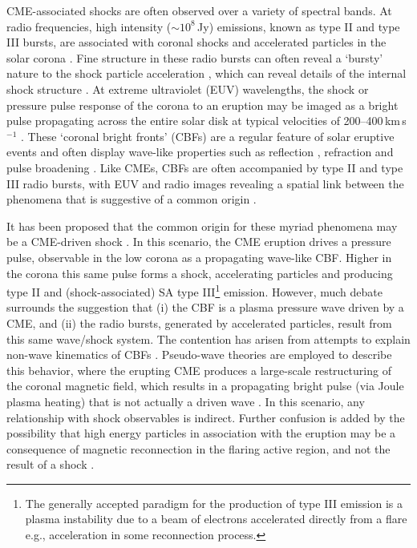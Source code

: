 

CME-associated shocks are often observed over a variety of spectral bands. At radio frequencies, high intensity ($\sim$$10^8$\,Jy) emissions, known as type II and type III bursts, are associated with coronal shocks and accelerated particles in the solar corona \citep{wild1950, mann1996}. Fine structure in these radio bursts can often reveal a \textquoteleft bursty' nature to the shock particle acceleration \citep{mann2005}, which can reveal details of the internal shock structure \citep{zlobec1993, guo2010}.
At extreme ultraviolet (EUV) wavelengths, the shock or pressure pulse response of the corona to an eruption may be imaged as a bright pulse propagating across the entire solar disk at typical velocities of 200--400\,km\,s$^{-1}$ \citep{gallagher2011}. These \textquoteleft coronal bright fronts' (CBFs) are a regular feature of solar eruptive events and often display wave-like properties such as reflection \citep{gopal2009}, refraction \citep{wang2000} and pulse broadening \citep{long2011}. %
Like CMEs, CBFs are often accompanied by type II and type III radio bursts, with EUV and radio images revealing a spatial link between the phenomena that is suggestive of a common origin \citep{maia2004, kozarev2011, vrsna2005}.


It has been proposed that the common origin for these myriad phenomena may be a CME-driven shock \citep{grechnev2011, warmuth2004b}.  In this scenario, the CME eruption drives a pressure pulse, observable in the low corona as a propagating wave-like CBF. Higher in the corona this same pulse forms a shock, accelerating particles and producing type II and {\color{black}(shock-associated) SA type III}\footnote{{\color{black}The generally accepted paradigm for the production of type III emission is a plasma instability due to a beam of electrons accelerated directly from a flare e.g., acceleration in some reconnection process.}} emission. However, much debate surrounds the suggestion that (i) the CBF is a plasma pressure wave driven by a CME, and (ii) the radio bursts, generated by accelerated particles, result from this same wave/shock system. The contention has arisen from attempts to explain non-wave kinematics of CBFs \citep{zhukov2009}. Pseudo-wave theories are employed to describe this behavior, where the erupting CME produces a large-scale restructuring of the coronal magnetic field, which results in a propagating bright pulse (via Joule plasma heating) that is not actually a driven wave \citep{delannee2008}. In this scenario, any relationship with shock observables is indirect. Further confusion is added by the possibility that high energy particles in association with the eruption may be a consequence of magnetic reconnection in the flaring active region, and not the result of a shock \citep{kahler2007}.

